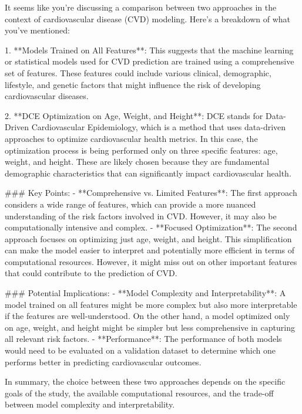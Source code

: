 It seems like you're discussing a comparison between two approaches in the context of cardiovascular disease (CVD) modeling. Here's a breakdown of what you've mentioned:

1. **Models Trained on All Features**: This suggests that the machine learning or statistical models used for CVD prediction are trained using a comprehensive set of features. These features could include various clinical, demographic, lifestyle, and genetic factors that might influence the risk of developing cardiovascular diseases.

2. **DCE Optimization on Age, Weight, and Height**: DCE stands for Data-Driven Cardiovascular Epidemiology, which is a method that uses data-driven approaches to optimize cardiovascular health metrics. In this case, the optimization process is being performed only on three specific features: age, weight, and height. These are likely chosen because they are fundamental demographic characteristics that can significantly impact cardiovascular health.

### Key Points:
- **Comprehensive vs. Limited Features**: The first approach considers a wide range of features, which can provide a more nuanced understanding of the risk factors involved in CVD. However, it may also be computationally intensive and complex.
- **Focused Optimization**: The second approach focuses on optimizing just age, weight, and height. This simplification can make the model easier to interpret and potentially more efficient in terms of computational resources. However, it might miss out on other important features that could contribute to the prediction of CVD.

### Potential Implications:
- **Model Complexity and Interpretability**: A model trained on all features might be more complex but also more interpretable if the features are well-understood. On the other hand, a model optimized only on age, weight, and height might be simpler but less comprehensive in capturing all relevant risk factors.
- **Performance**: The performance of both models would need to be evaluated on a validation dataset to determine which one performs better in predicting cardiovascular outcomes.

In summary, the choice between these two approaches depends on the specific goals of the study, the available computational resources, and the trade-off between model complexity and interpretability.